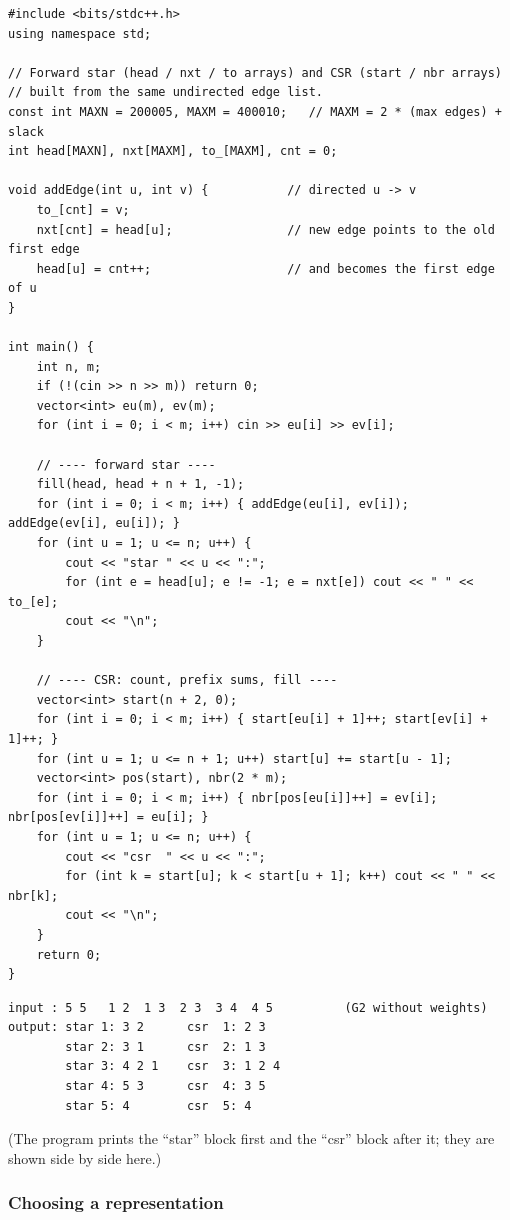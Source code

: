 \begin{lstlisting}[style=cpp]
#include <bits/stdc++.h>
using namespace std;

// Forward star (head / nxt / to arrays) and CSR (start / nbr arrays)
// built from the same undirected edge list.
const int MAXN = 200005, MAXM = 400010;   // MAXM = 2 * (max edges) + slack
int head[MAXN], nxt[MAXM], to_[MAXM], cnt = 0;

void addEdge(int u, int v) {           // directed u -> v
    to_[cnt] = v;
    nxt[cnt] = head[u];                // new edge points to the old first edge
    head[u] = cnt++;                   // and becomes the first edge of u
}

int main() {
    int n, m;
    if (!(cin >> n >> m)) return 0;
    vector<int> eu(m), ev(m);
    for (int i = 0; i < m; i++) cin >> eu[i] >> ev[i];

    // ---- forward star ----
    fill(head, head + n + 1, -1);
    for (int i = 0; i < m; i++) { addEdge(eu[i], ev[i]); addEdge(ev[i], eu[i]); }
    for (int u = 1; u <= n; u++) {
        cout << "star " << u << ":";
        for (int e = head[u]; e != -1; e = nxt[e]) cout << " " << to_[e];
        cout << "\n";
    }

    // ---- CSR: count, prefix sums, fill ----
    vector<int> start(n + 2, 0);
    for (int i = 0; i < m; i++) { start[eu[i] + 1]++; start[ev[i] + 1]++; }
    for (int u = 1; u <= n + 1; u++) start[u] += start[u - 1];
    vector<int> pos(start), nbr(2 * m);
    for (int i = 0; i < m; i++) { nbr[pos[eu[i]]++] = ev[i]; nbr[pos[ev[i]]++] = eu[i]; }
    for (int u = 1; u <= n; u++) {
        cout << "csr  " << u << ":";
        for (int k = start[u]; k < start[u + 1]; k++) cout << " " << nbr[k];
        cout << "\n";
    }
    return 0;
}
\end{lstlisting}

\begin{lstlisting}[style=trace]
input : 5 5   1 2  1 3  2 3  3 4  4 5          (G2 without weights)
output: star 1: 3 2      csr  1: 2 3
        star 2: 3 1      csr  2: 1 3
        star 3: 4 2 1    csr  3: 1 2 4
        star 4: 5 3      csr  4: 3 5
        star 5: 4        csr  5: 4
\end{lstlisting}
(The program prints the ``star'' block first and the ``csr'' block after it; they are shown side by side here.)

\subsubsection*{Choosing a representation}

